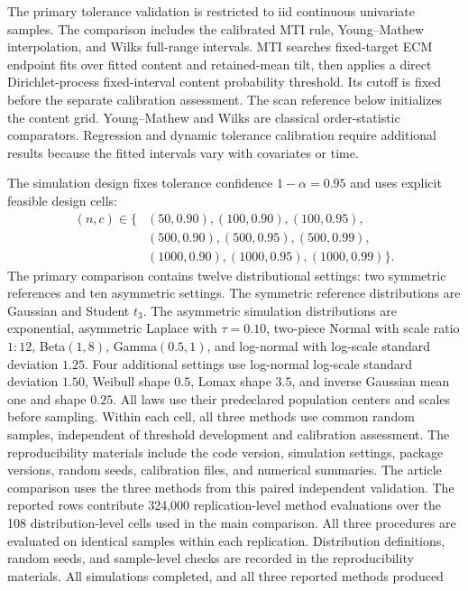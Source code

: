 \documentclass[11pt]{article}
\begin{document}
The primary tolerance validation is restricted to iid continuous univariate
samples. The comparison includes the calibrated MTI rule, Young--Mathew
interpolation, and Wilks full-range intervals. MTI
searches fixed-target ECM endpoint fits over fitted content and retained-mean tilt,
then applies a direct Dirichlet-process fixed-interval content probability
threshold. Its cutoff is fixed before the separate calibration assessment.
The scan reference below initializes the content grid. Young--Mathew and Wilks are classical order-statistic
comparators. Regression and dynamic tolerance calibration require additional
results because the fitted intervals vary with covariates or time.

The simulation design fixes tolerance confidence \(1-\alpha=0.95\) and uses
explicit feasible design cells:
\[
  \begin{aligned}
  (n,c)\in\{&
  (50,0.90),(100,0.90),(100,0.95),\\
  &(500,0.90),(500,0.95),(500,0.99),\\
  &(1000,0.90),(1000,0.95),(1000,0.99)\}.
  \end{aligned}
\]
The primary comparison contains twelve distributional settings: two symmetric
references and ten asymmetric settings. The symmetric reference distributions are
Gaussian and Student \(t_3\). The asymmetric simulation distributions are
exponential, asymmetric Laplace with \(\tau=0.10\), two-piece Normal with scale
ratio \(1{:}12\), Beta\((1,8)\), Gamma\((0.5,1)\), and log-normal with
log-scale standard deviation \(1.25\). Four additional settings use log-normal
log-scale standard deviation \(1.50\), Weibull shape \(0.5\), Lomax shape
\(3.5\), and inverse Gaussian mean one and shape \(0.25\).
All laws use their predeclared population centers and scales before sampling.
Within each cell, all three methods use common random samples,
independent of threshold development and calibration assessment. The
reproducibility materials include the code version, simulation settings,
package versions, random seeds, calibration files, and numerical summaries.
The article comparison uses the three methods from this paired independent
validation. The reported rows contribute 324,000
replication-level method evaluations over the 108 distribution-level cells used in the main
comparison. All three procedures are evaluated on identical samples within
each replication. Distribution definitions, random seeds, and sample-level
checks are recorded in the reproducibility materials. All simulations
completed, and all three reported methods produced
\end{document}
